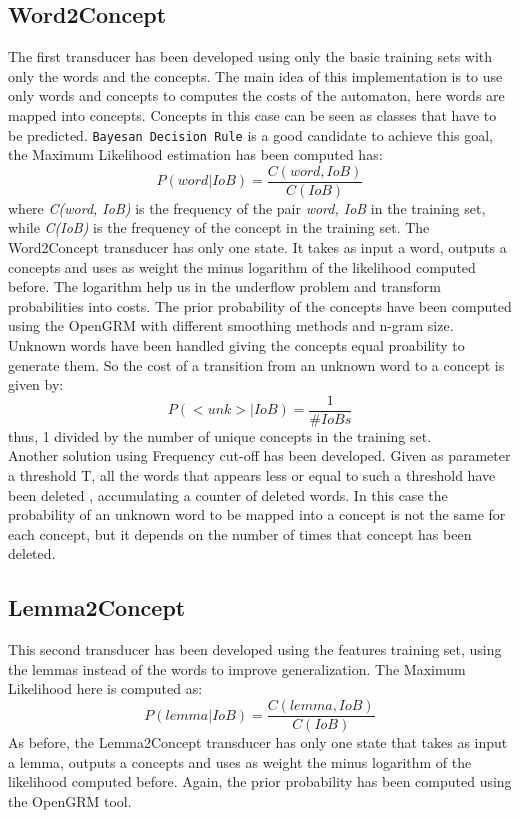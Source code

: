 \documentclass[11pt,a4paper]{article}
\begin{document}
\subsection{Word2Concept}
    The first transducer has been developed using only the basic training sets with only the words and the concepts. The main idea of this implementation is to use only words and concepts to computes the costs of the automaton, here words are mapped into concepts. Concepts in this case can be seen as classes that have to be predicted. \texttt{Bayesan Decision Rule} is a good candidate to achieve this goal, the Maximum Likelihood estimation has been computed has:
\begin{equation}
    P(word| IoB) = \frac{C(word, IoB)}{C(IoB)}
\end{equation}
where \textit{C(word, IoB)} is the frequency of the pair \textit{word, IoB} in the training set, while \textit{C(IoB)} is the frequency of the concept in the training set.
The Word2Concept transducer has only one state. It takes as input a word, outputs a concepts and uses as weight the minus logarithm of the likelihood computed before. The logarithm help us in the underflow problem and transform probabilities into costs. The prior probability of the concepts have been computed using the OpenGRM with different smoothing methods and n-gram size.
Unknown words have been handled giving the concepts equal proability to generate them. So the cost of a transition from an unknown word to a concept is given by:
\begin{equation}
    P(<unk> | IoB) = \frac{1}{\#IoBs}
\end{equation}
thus, 1 divided by the number of unique concepts in the training set. \\
Another solution using Frequency cut-off has been developed. Given as parameter a threshold T, all the words that appears less or equal to such a threshold have been deleted , accumulating a counter of deleted words. In this case the probability of an unknown word to be mapped into a concept is not the same for each concept, but it depends on the number of times that concept has been deleted.
\subsection{Lemma2Concept}
    This second transducer has been developed using the features training set, using the lemmas instead of the words to improve generalization. The Maximum Likelihood here is computed as:
\begin{equation}
    P(lemma| IoB) = \frac{C(lemma, IoB)}{C(IoB)}
\end{equation}
As before, the Lemma2Concept transducer has only one state that takes as input a lemma, outputs a concepts and uses as weight the minus logarithm of the likelihood computed before. Again, the prior probability has been computed using the OpenGRM tool.
\end{document}
